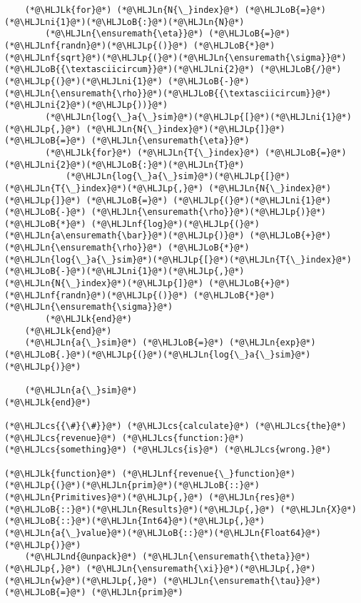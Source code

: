 \documentclass[12pt,a4paper]{article}
\newcommand{\HLJLk}[1]{\textcolor[RGB]{148,91,176}{\textbf{#1}}}
\newcommand{\HLJLn}[1]{#1}
\newcommand{\HLJLnd}[1]{\textcolor[RGB]{214,102,97}{#1}}
\newcommand{\HLJLnf}[1]{\textcolor[RGB]{66,102,213}{#1}}
\newcommand{\HLJLni}[1]{\textcolor[RGB]{59,151,46}{#1}}
\newcommand{\HLJLoB}[1]{\textcolor[RGB]{102,102,102}{\textbf{#1}}}
\newcommand{\HLJLp}[1]{#1}
\newcommand{\HLJLcs}[1]{\textcolor[RGB]{153,153,119}{\textit{#1}}}
\begin{document}
\begin{lstlisting}
    (*@\HLJLk{for}@*) (*@\HLJLn{N{\_}index}@*) (*@\HLJLoB{=}@*) (*@\HLJLni{1}@*)(*@\HLJLoB{:}@*)(*@\HLJLn{N}@*)
        (*@\HLJLn{\ensuremath{\eta}}@*) (*@\HLJLoB{=}@*) (*@\HLJLnf{randn}@*)(*@\HLJLp{()}@*) (*@\HLJLoB{*}@*) (*@\HLJLnf{sqrt}@*)(*@\HLJLp{(}@*)(*@\HLJLn{\ensuremath{\sigma}}@*)(*@\HLJLoB{{\textasciicircum}}@*)(*@\HLJLni{2}@*) (*@\HLJLoB{/}@*) (*@\HLJLp{(}@*)(*@\HLJLni{1}@*) (*@\HLJLoB{-}@*) (*@\HLJLn{\ensuremath{\rho}}@*)(*@\HLJLoB{{\textasciicircum}}@*)(*@\HLJLni{2}@*)(*@\HLJLp{))}@*)
        (*@\HLJLn{log{\_}a{\_}sim}@*)(*@\HLJLp{[}@*)(*@\HLJLni{1}@*)(*@\HLJLp{,}@*) (*@\HLJLn{N{\_}index}@*)(*@\HLJLp{]}@*) (*@\HLJLoB{=}@*) (*@\HLJLn{\ensuremath{\eta}}@*)
        (*@\HLJLk{for}@*) (*@\HLJLn{T{\_}index}@*) (*@\HLJLoB{=}@*) (*@\HLJLni{2}@*)(*@\HLJLoB{:}@*)(*@\HLJLn{T}@*)
            (*@\HLJLn{log{\_}a{\_}sim}@*)(*@\HLJLp{[}@*)(*@\HLJLn{T{\_}index}@*)(*@\HLJLp{,}@*) (*@\HLJLn{N{\_}index}@*)(*@\HLJLp{]}@*) (*@\HLJLoB{=}@*) (*@\HLJLp{(}@*)(*@\HLJLni{1}@*) (*@\HLJLoB{-}@*) (*@\HLJLn{\ensuremath{\rho}}@*)(*@\HLJLp{)}@*) (*@\HLJLoB{*}@*) (*@\HLJLnf{log}@*)(*@\HLJLp{(}@*)(*@\HLJLn{a\ensuremath{\bar}}@*)(*@\HLJLp{)}@*) (*@\HLJLoB{+}@*) (*@\HLJLn{\ensuremath{\rho}}@*) (*@\HLJLoB{*}@*) (*@\HLJLn{log{\_}a{\_}sim}@*)(*@\HLJLp{[}@*)(*@\HLJLn{T{\_}index}@*)(*@\HLJLoB{-}@*)(*@\HLJLni{1}@*)(*@\HLJLp{,}@*) (*@\HLJLn{N{\_}index}@*)(*@\HLJLp{]}@*) (*@\HLJLoB{+}@*) (*@\HLJLnf{randn}@*)(*@\HLJLp{()}@*) (*@\HLJLoB{*}@*) (*@\HLJLn{\ensuremath{\sigma}}@*)
        (*@\HLJLk{end}@*)
    (*@\HLJLk{end}@*)
    (*@\HLJLn{a{\_}sim}@*) (*@\HLJLoB{=}@*) (*@\HLJLn{exp}@*)(*@\HLJLoB{.}@*)(*@\HLJLp{(}@*)(*@\HLJLn{log{\_}a{\_}sim}@*)(*@\HLJLp{)}@*)

    (*@\HLJLn{a{\_}sim}@*)
(*@\HLJLk{end}@*)

(*@\HLJLcs{{\#}{\#}}@*) (*@\HLJLcs{calculate}@*) (*@\HLJLcs{the}@*) (*@\HLJLcs{revenue}@*) (*@\HLJLcs{function:}@*) (*@\HLJLcs{something}@*) (*@\HLJLcs{is}@*) (*@\HLJLcs{wrong.}@*)

(*@\HLJLk{function}@*) (*@\HLJLnf{revenue{\_}function}@*)(*@\HLJLp{(}@*)(*@\HLJLn{prim}@*)(*@\HLJLoB{::}@*)(*@\HLJLn{Primitives}@*)(*@\HLJLp{,}@*) (*@\HLJLn{res}@*)(*@\HLJLoB{::}@*)(*@\HLJLn{Results}@*)(*@\HLJLp{,}@*) (*@\HLJLn{X}@*)(*@\HLJLoB{::}@*)(*@\HLJLn{Int64}@*)(*@\HLJLp{,}@*) (*@\HLJLn{a{\_}value}@*)(*@\HLJLoB{::}@*)(*@\HLJLn{Float64}@*)(*@\HLJLp{)}@*)
    (*@\HLJLnd{@unpack}@*) (*@\HLJLn{\ensuremath{\theta}}@*)(*@\HLJLp{,}@*) (*@\HLJLn{\ensuremath{\xi}}@*)(*@\HLJLp{,}@*) (*@\HLJLn{w}@*)(*@\HLJLp{,}@*) (*@\HLJLn{\ensuremath{\tau}}@*) (*@\HLJLoB{=}@*) (*@\HLJLn{prim}@*)


\end{lstlisting}
\end{document}
